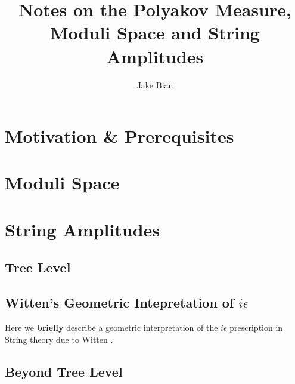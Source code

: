 \documentclass{article}
\title{Notes on the Polyakov Measure, Moduli Space and String Amplitudes}
\author{Jake Bian}
\begin{document}
    \graphicspath{ {images/} }
    \newtheorem{defn}{Definition}[section]
    \newtheorem{prop}{Proposition}[section]
    \newtheorem{corr}{Corollary}[section]
    \newtheorem{remark}{Remark}[section]

    \maketitle


    \tableofcontents

    \section{Motivation \& Prerequisites}
        

    \section{Moduli Space}
        

    \section{String Amplitudes}
        \subsection{Tree Level}
        \subsection{Witten's Geometric Intepretation of $i \epsilon$}
            Here we \textbf{briefly} describe a geometric interpretation of the $i \epsilon$ prescription in String theory due to Witten \cite{witten-ieps}.
        \subsection{Beyond Tree Level}



    {}
    
\end{document}
